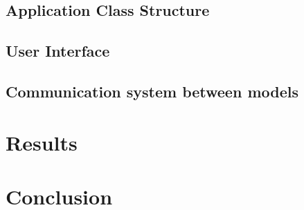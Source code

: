\documentclass{article}
\begin{document}
\subsection{Application Class Structure}
\subsection{User Interface}
\subsection{Communication system between models}

\section{Results}

\section{Conclusion}





\newpage 
\end{document}
